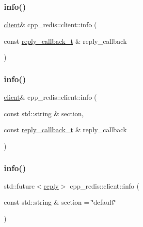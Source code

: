 \mbox{\label{classcpp__redis_1_1client_aaa98ba6f8936eaa013ca0df553199f85}} 
\subsubsection{\texorpdfstring{info()}{info()}\hspace{0.1cm}{\footnotesize\ttfamily [1/3]}}
{\footnotesize\ttfamily \hyperlink{classcpp__redis_1_1client}{client}\& cpp\+\_\+redis\+::client\+::info (\begin{DoxyParamCaption}\item[{const \hyperlink{classcpp__redis_1_1client_a061a1140d36d2eaeda82b09a0bb3f9f2}{reply\+\_\+callback\+\_\+t} \&}]{reply\+\_\+callback }\end{DoxyParamCaption})}

\mbox{\label{classcpp__redis_1_1client_af276159a3938c97e5318dff39a9084ae}} 
\subsubsection{\texorpdfstring{info()}{info()}\hspace{0.1cm}{\footnotesize\ttfamily [2/3]}}
{\footnotesize\ttfamily \hyperlink{classcpp__redis_1_1client}{client}\& cpp\+\_\+redis\+::client\+::info (\begin{DoxyParamCaption}\item[{const std\+::string \&}]{section,  }\item[{const \hyperlink{classcpp__redis_1_1client_a061a1140d36d2eaeda82b09a0bb3f9f2}{reply\+\_\+callback\+\_\+t} \&}]{reply\+\_\+callback }\end{DoxyParamCaption})}

\mbox{\label{classcpp__redis_1_1client_aa0186723d51c8b3c92979537e8ad43b9}} 
\subsubsection{\texorpdfstring{info()}{info()}\hspace{0.1cm}{\footnotesize\ttfamily [3/3]}}
{\footnotesize\ttfamily std\+::future$<$\hyperlink{classcpp__redis_1_1reply}{reply}$>$ cpp\+\_\+redis\+::client\+::info (\begin{DoxyParamCaption}\item[{const std\+::string \&}]{section = {\ttfamily \char`\"{}default\char`\"{}} }\end{DoxyParamCaption})}

